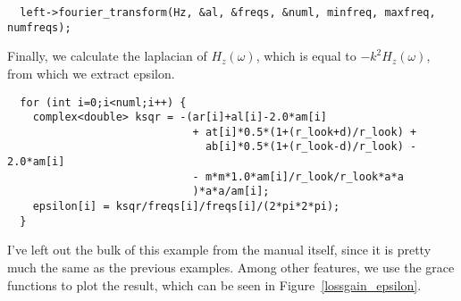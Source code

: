 \begin{verbatim}
  left->fourier_transform(Hz, &al, &freqs, &numl, minfreq, maxfreq, numfreqs);
\end{verbatim}
\begin{comment}
  delete[] freqs;
  master_printf("Working on middle fourier transform...\n");
  middle->fourier_transform(Hz, &am, &freqs, &numr, minfreq, maxfreq, numfreqs);
  delete[] freqs;
  master_printf("Working on top fourier transform...\n");
  top->fourier_transform(Hz, &at, &freqs, &numr, minfreq, maxfreq, numfreqs);
  delete[] freqs;
  master_printf("Working on bottom fourier transform...\n");
  bottom->fourier_transform(Hz, &ab, &freqs, &numr, minfreq, maxfreq, numfreqs);
  delete[] freqs;
  master_printf("Working on right fourier transform...\n");
  right->fourier_transform(Hz, &ar, &freqs, &numr, minfreq, maxfreq, numfreqs);
  if (numl != numr)
    master_printf("Aaack you need both nums to be the same!\n");
  g.new_set();
  g.set_legend("\\x\\e\\s1\\N");
  complex<double> *epsilon = new complex<double>[numl];
\end{comment}

Finally, we calculate the laplacian of $H_z(\omega)$, which is equal to
$-k^2 H_z(\omega)$, from which we extract epsilon.

\begin{verbatim}
  for (int i=0;i<numl;i++) {
    complex<double> ksqr = -(ar[i]+al[i]-2.0*am[i]
                             + at[i]*0.5*(1+(r_look+d)/r_look) +
                               ab[i]*0.5*(1+(r_look-d)/r_look) - 2.0*am[i]
                             - m*m*1.0*am[i]/r_look/r_look*a*a
                             )*a*a/am[i];
    epsilon[i] = ksqr/freqs[i]/freqs[i]/(2*pi*2*pi);
  }
\end{verbatim}

I've left out the bulk of this example from the manual itself, since it
is pretty much the same as the previous examples.  Among other features, we
use the grace functions to plot the result, which can be seen in
Figure~\ref{lossgain_epsilon}.

